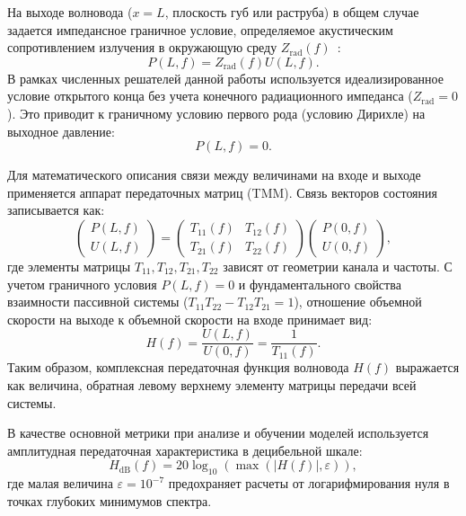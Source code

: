 На выходе волновода ($x=L$, плоскость губ или раструба) в общем случае задается импедансное граничное условие, определяемое акустическим сопротивлением излучения в окружающую среду $Z_{\mathrm{rad}}(f)$~\cite{makarov2009}:
\begin{equation}
    P(L, f) = Z_{\mathrm{rad}}(f) U(L, f).
\end{equation}
В рамках численных решателей данной работы используется идеализированное условие открытого конца без учета конечного радиационного импеданса ($Z_{\mathrm{rad}} = 0$). Это приводит к граничному условию первого рода (условию Дирихле) на выходное давление:
\begin{equation}
    P(L, f) = 0.
\end{equation}

Для математического описания связи между величинами на входе и выходе применяется аппарат передаточных матриц (TMM). Связь векторов состояния записывается как:
\begin{equation}
    \begin{pmatrix}
        P(L, f) \\
        U(L, f)
    \end{pmatrix}
    =
    \begin{pmatrix}
        T_{11}(f) & T_{12}(f) \\
        T_{21}(f) & T_{22}(f)
    \end{pmatrix}
    \begin{pmatrix}
        P(0, f) \\
        U(0, f)
    \end{pmatrix},
\end{equation}
где элементы матрицы $T_{11}, T_{12}, T_{21}, T_{22}$ зависят от геометрии канала и частоты. С учетом граничного условия $P(L, f) = 0$ и фундаментального свойства взаимности пассивной системы ($T_{11}T_{22} - T_{12}T_{21} = 1$), отношение объемной скорости на выходе к объемной скорости на входе принимает вид:
\begin{equation}
    H(f) = \frac{U(L, f)}{U(0, f)} = \frac{1}{T_{11}(f)}.
    \label{eq:tf_derivation}
\end{equation}
Таким образом, комплексная передаточная функция волновода $H(f)$ выражается как величина, обратная левому верхнему элементу матрицы передачи всей системы.

В качестве основной метрики при анализе и обучении моделей используется амплитудная передаточная характеристика в децибельной шкале:
\begin{equation}
    H_\mathrm{dB}(f)
    =
    20\log_{10}\left(
        \max\left(|H(f)|,\varepsilon\right)
    \right),
    \label{eq:db}
\end{equation}
где малая величина $\varepsilon = 10^{-7}$ предохраняет расчеты от логарифмирования нуля в точках глубоких минимумов спектра.

